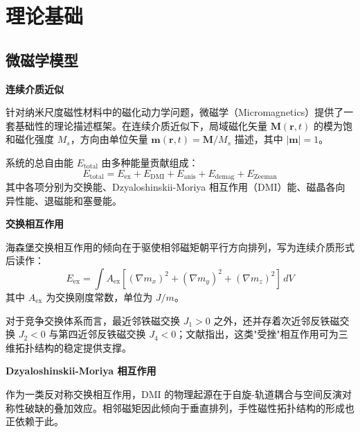\chapter{理论基础}

\section{微磁学模型}

\par\noindent\textbf{连续介质近似}\par\nobreak

针对纳米尺度磁性材料中的磁化动力学问题，微磁学（Micromagnetics）提供了一套基础性的理论描述框架。在连续介质近似下，局域磁化矢量 $\mathbf{M}(\mathbf{r}, t)$ 的模为饱和磁化强度 $M_s$，方向由单位矢量 $\mathbf{m}(\mathbf{r}, t) = \mathbf{M}/M_s$ 描述，其中 $|\mathbf{m}| = 1$。

系统的总自由能 $E_{\text{total}}$ 由多种能量贡献组成：
\begin{equation}
  E_{\text{total}} = E_{\text{ex}} + E_{\text{DMI}} + E_{\text{anis}} + E_{\text{demag}} + E_{\text{Zeeman}}
  \label{eq:total-energy}
\end{equation}
其中各项分别为交换能、Dzyaloshinskii-Moriya 相互作用（DMI）能、磁晶各向异性能、退磁能和塞曼能。

\par\noindent\textbf{交换相互作用}\par\nobreak

海森堡交换相互作用的倾向在于驱使相邻磁矩朝平行方向排列，写为连续介质形式后读作：
\begin{equation}
  E_{\text{ex}} = \int A_{\text{ex}} \left[ (\nabla m_x)^2 + (\nabla m_y)^2 + (\nabla m_z)^2 \right] \, dV
  \label{eq:exchange}
\end{equation}
其中 $A_{\text{ex}}$ 为交换刚度常数，单位为 $\si{J/m}$。

对于竞争交换体系而言，最近邻铁磁交换 $J_1 > 0$ 之外，还并存着次近邻反铁磁交换 $J_2 < 0$ 与第四近邻反铁磁交换 $J_4 < 0$；文献\cite{sallermann2023stability}指出，这类"受挫"相互作用可为三维拓扑结构的稳定提供支撑。

\par\noindent\textbf{Dzyaloshinskii-Moriya 相互作用}\par\nobreak

作为一类反对称交换相互作用，DMI 的物理起源在于自旋-轨道耦合与空间反演对称性破缺的叠加效应。相邻磁矩因此倾向于垂直排列，手性磁性拓扑结构的形成也正依赖于此。

